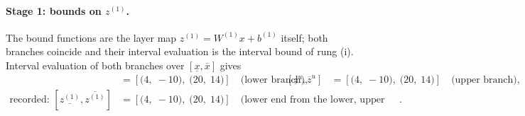 \documentclass[11pt]{article}
\begin{document}
\paragraph{Stage 1: bounds on $z^{(1)}$.}
The bound functions are the layer map $z^{(1)} = W^{(1)} x + b^{(1)}$ itself; both branches coincide and their interval evaluation is the interval bound of rung (i).
Interval evaluation of both branches over $[\underline{x}, \overline{x}]$ gives
\begin{align*}
[\underline{z}^{\ell}, \overline{z}^{\ell}] &= [\bigl(4,\; -10\bigr),\; \bigl(20,\; 14\bigr)] \quad\text{(lower branch)}, & [\underline{z}^{u}, \overline{z}^{u}] &= [\bigl(4,\; -10\bigr),\; \bigl(20,\; 14\bigr)] \quad\text{(upper branch)}, \\
\text{recorded: } [\underline{z^{(1)}}, \overline{z^{(1)}}] &= [\bigl(4,\; -10\bigr),\; \bigl(20,\; 14\bigr)] \quad\text{(lower end from the lower, upper end from the upper branch)}.
\end{align*}
\end{document}
